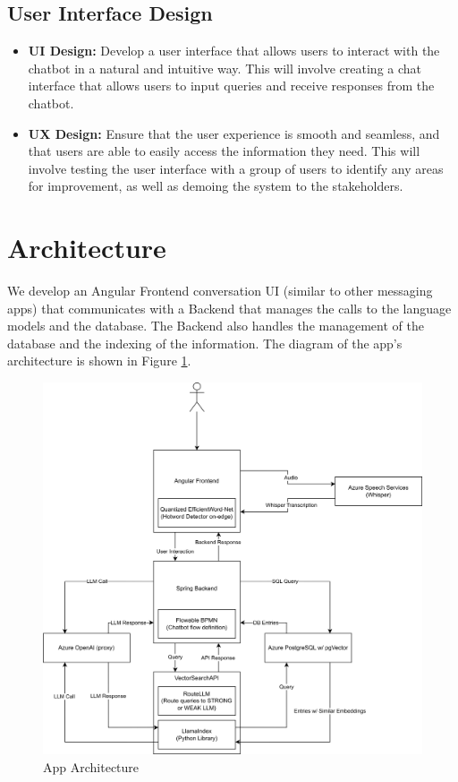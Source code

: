 \documentclass[a4paper,12pt,twoside]{ThesisStyle}
\begin{document}
\subsection{User Interface Design}
\label{subsec:ui-design}

\begin{itemize}
  \item \textbf{UI Design:} Develop a user interface that allows users to interact with the chatbot in a natural and intuitive way. This will involve creating a chat interface that allows users to input queries and receive responses from the chatbot.
  \item \textbf{UX Design:} Ensure that the user experience is smooth and seamless, and that users are able to easily access the information they need. This will involve testing the user interface with a group of users to identify any areas for improvement, as well as demoing the system to the stakeholders.
\end{itemize}


\section{Architecture}

We develop an Angular Frontend conversation UI (similar to other messaging apps) that communicates with a Backend that manages the calls to the language models and the database. The Backend also handles the management of the database and the indexing of the information. The diagram of the app's architecture is shown in Figure \ref{fig:architecture}.

\begin{figure}[htb]
\label{fig:architecture}
  \centering
\includegraphics[width=1\textwidth]{imatges/Full DSO App Architecture.drawio.png}
\caption{App Architecture}
\end{figure}
\end{document}
